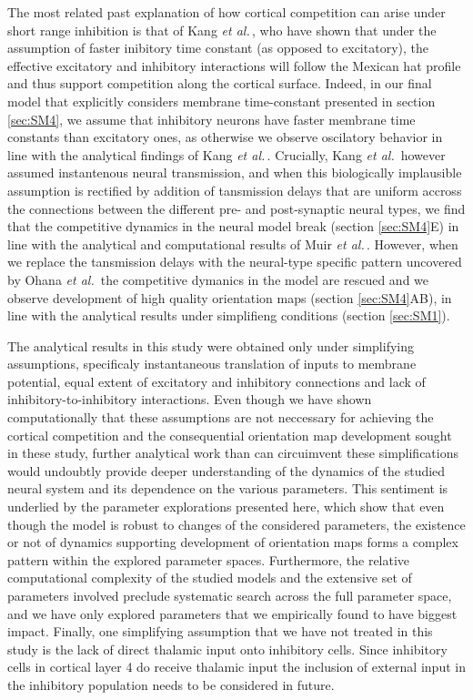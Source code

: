 \documentclass[a4paper,10pt]{article}
\newcommand{\etal}{\textit{et al.}}
\begin{document}
The most related past explanation of how cortical competition can arise under short range inhibition is that of Kang \etal\,\cite{Kang2003}, who have shown 
that under the assumption of faster inibitory time constant (as opposed to excitatory), the effective excitatory and inhibitory interactions will follow the 
Mexican hat profile and thus support competition along the cortical surface. Indeed, in our final model that explicitly considers membrane time-constant presented in section \ref{sec:SM4}, 
we assume that inhibitory neurons have faster membrane time constants than excitatory ones, as otherwise we observe oscilatory behavior in line with the analytical findings of Kang \etal\,\cite{Kang2003}. 
Crucially, Kang \etal\,\cite{Kang2003} however assumed instantenous neural transmission, and when this biologically implausible assumption is rectified by addition of tansmission delays that are uniform 
accross the connections between the different pre- and post-synaptic neural types, we find that the competitive dynamics in the neural model break (section \ref{sec:SM4}E) in line with the analytical and 
computational results of Muir \etal\,\cite{Muir2014}. However, when we replace the tansmission delays with the neural-type specific  pattern uncovered by Ohana \etal\,\cite{Ohana2012} the competitive dymanics 
in the model are rescued and we observe development of high quality orientation maps (section \ref{sec:SM4}AB), in line with the analytical results under simplifieng conditions (section \ref{sec:SM1}).

The analytical results in this study were obtained only under simplifying assumptions, specificaly instantaneous translation of inputs to membrane potential, equal extent of 
excitatory and inhibitory connections and lack of inhibitory-to-inhibitory interactions. Even though we have shown computationally that these assumptions are not neccessary 
for achieving the cortical competition and the consequential orientation map development sought in these study, further analytical work than can circuimvent these simplifications would 
undoubtly provide deeper understanding of the dynamics of the studied neural system and its dependence on the various parameters. This sentiment is underlied by the parameter 
explorations presented here, which show that even though the model is robust to changes of the considered parameters, the existence or not of dynamics supporting development of 
orientation maps forms a complex pattern within the explored parameter spaces. Furthermore, the relative computational complexity of the studied models and the extensive set of parameters
involved preclude systematic search across the full parameter space, and we have only explored parameters that we empirically found to have biggest impact. Finally, one simplifying assumption 
that we have not treated in this study is the lack of direct thalamic input onto inhibitory cells. Since inhibitory cells in cortical layer 4 do receive thalamic input \cite{Binzegger2004} the 
inclusion of external input in the inhibitory population needs to be considered in future.





\end{document}
